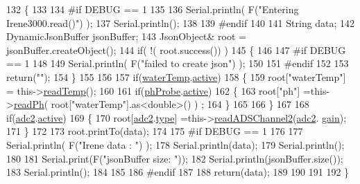 \begin{DoxyCode}
132 \{
133 
134 \textcolor{preprocessor}{#if DEBUG == 1 }
135     
136     Serial.println( F(\textcolor{stringliteral}{"Entering Irene3000.read()"}) );
137     Serial.println();
138 
139 \textcolor{preprocessor}{#endif }
140 
141     String data;
142     DynamicJsonBuffer jsonBuffer;
143     JsonObject& root = jsonBuffer.createObject();
144     \textcolor{keywordflow}{if}( !( root.success()) )
145     \{
146     
147 \textcolor{preprocessor}{    #if DEBUG == 1 }
148 
149         Serial.println( F(\textcolor{stringliteral}{"failed to create json"}) );
150     
151 \textcolor{preprocessor}{    #endif }
152 
153         \textcolor{keywordflow}{return}(\textcolor{stringliteral}{""});
154     \}
155 
156         
157     \textcolor{keywordflow}{if}(\hyperlink{class_irene3000_af05612c78c758ce9db316c75ad937130}{waterTemp}.\hyperlink{struct_irene3000_1_1state_a879828ace7e7a7bc91ff703bfee36599}{active})
158     \{
159         root[\textcolor{stringliteral}{"waterTemp"}] = this->\hyperlink{class_irene3000_a80bc6dfea106dc3bc54fa20204d4d5dc}{readTemp}();
160 
161         \textcolor{keywordflow}{if}(\hyperlink{class_irene3000_a997a4ee466fa1d5416e07e444965dc9e}{phProbe}.\hyperlink{struct_irene3000_1_1state_a879828ace7e7a7bc91ff703bfee36599}{active})
162         \{
163             root[\textcolor{stringliteral}{"ph"}] =this->\hyperlink{class_irene3000_a436fc0a06681cd0784aba56b9707f19a}{readPh}( root[\textcolor{stringliteral}{"waterTemp"}].as<double>() ) ;
164         \}
165 
166     \}
167 
168     \textcolor{keywordflow}{if}(\hyperlink{class_irene3000_aae3a95a1c83c766cd2f299ce471c337e}{adc2}.\hyperlink{struct_irene3000_1_1state_a879828ace7e7a7bc91ff703bfee36599}{active})
169     \{
170         root[\hyperlink{class_irene3000_aae3a95a1c83c766cd2f299ce471c337e}{adc2}.\hyperlink{struct_irene3000_1_1state_a9897a7e02727db6351d44006eec73799}{type}] =this->\hyperlink{class_irene3000_ae73bd2ed14a199a7e83f4d6458476a7c}{readADSChannel2}(\hyperlink{class_irene3000_aae3a95a1c83c766cd2f299ce471c337e}{adc2}.
      \hyperlink{struct_irene3000_1_1state_a1ecf69d38cb31ecaf6b3602a3f3e93cb}{gain});
171     \}
172     
173     root.printTo(data);
174     
175 \textcolor{preprocessor}{#if DEBUG == 1 }
176 
177     Serial.println( F(\textcolor{stringliteral}{"Irene data : "}) );
178     Serial.println(data);
179     Serial.println();
180 
181     Serial.print(F(\textcolor{stringliteral}{"jsonBuffer size: "}));
182     Serial.println(jsonBuffer.size());
183     Serial.println();
184 
185 
186 \textcolor{preprocessor}{#endif}
187     
188     \textcolor{keywordflow}{return}(data);
189     
190     
191 
192 \}
\end{DoxyCode}
